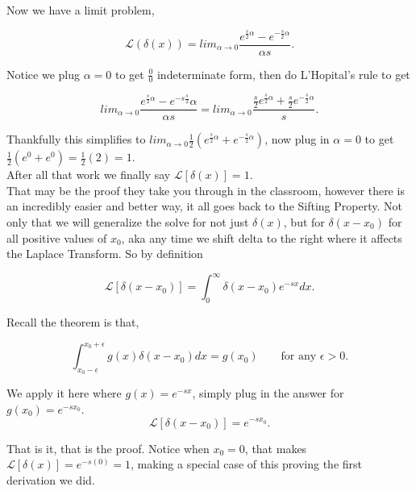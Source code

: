 \documentclass[12pt]{article}
\newcommand{\lp}{\mathscr{L}}
\begin{document}
Now we have a limit problem,

\begin{equation*}
    \lp(\delta(x))=lim_{\alpha\rightarrow0}\frac{e^{\frac{s}{2}\alpha}-e^{-\frac{s}{2}\alpha}}{\alpha s}.
\end{equation*}

Notice we plug $\alpha=0$ to get $\frac{0}{0}$ indeterminate form, then do L'Hopital's rule to get

\begin{equation*}
    lim_{\alpha\rightarrow0}\frac{e^{\frac{s}{2}\alpha}-e^{-s\frac{s}{2}}\alpha}{\alpha s}=lim_{\alpha\rightarrow0}\frac{\frac{s}{2}e^{\frac{s}{2}\alpha}+\frac{s}{2}e^{-\frac{s}{2}\alpha}}{s}.
\end{equation*}

Thankfully this simplifies to $lim_{\alpha\rightarrow0}\frac{1}{2}\left(e^{\frac{s}{2}\alpha}+e^{-\frac{s}{2}\alpha}\right)$, now plug in $\alpha=0$ to get $\frac{1}{2}\left(e^0+e^0\right)=\frac{1}{2}(2)=1$. \\

After all that work we finally say $\lp[\delta(x)]=1$. \\

That may be the proof they take you through in the classroom, however there is an incredibly easier and better way, it all goes back to the Sifting Property. Not only that we will generalize the solve for not just $\delta(x)$, but for $\delta(x-x_0)$ for all positive values of $x_0$, aka any time we shift delta to the right where it affects the Laplace Transform. So by definition

\begin{equation*}
    \lp[\delta(x-x_0)]=\int_{0}^{\infty} \delta(x-x_0) e^{-sx} dx.
\end{equation*}

Recall the theorem is that, 

\begin{equation*}
    \int_{x_0-\epsilon}^{x_0+\epsilon} g(x)\delta(x-x_0) dx = g(x_0) \qquad \text{for any } \epsilon>0.
\end{equation*}

We apply it here where $g(x)=e^{-sx}$, simply plug in the answer for $g(x_0)=e^{-sx_0}$. \\

\begin{equation*}
    \lp[\delta(x-x_0)]= e^{-sx_0}.
\end{equation*}

That is it, that is the proof. Notice when $x_0=0$, that makes $\lp[\delta(x)]=e^{-s(0)}=1$, making a special case of this proving the first derivation we did. \\
\end{document}
